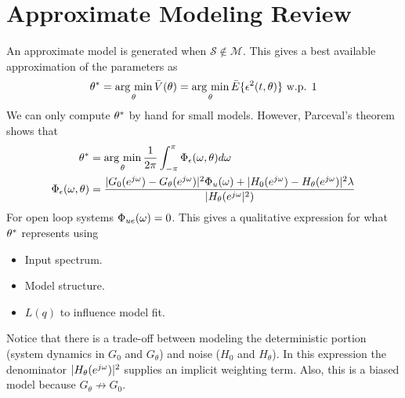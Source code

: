 \mainmatter%
\setcounter{page}{1}

\lectureseries[\course]{\course}

\date{November 24, 2009}

\setaddress%

\setcounter{lecture}{16}
\setcounter{chapter}{16}


\section{Approximate Modeling Review}
An approximate model is generated when $\mathcal{S}\notin\mathcal{M}$.
This gives a best available approximation of the parameters as
$$\theta^\ast = \mathop{\arg\,\min}\limits_\theta \bar{V}(\theta) = \mathop{\arg\,\min}\limits_\theta\bar{E}\{\epsilon^2(t,\theta)\} \text{ w.p. } 1$$
We can only compute $\theta^\ast$ by hand for small models.
However, Parceval's theorem shows that
\begin{align*}
\theta^\ast &= \mathop{\arg\,\min}\limits_\theta \frac{1}{2\pi}\int_{-\pi}^\pi \Phi_\epsilon(\omega,\theta)d\omega \\
\Phi_\epsilon(\omega,\theta) &= \frac{|G_0(e^{j\omega})-G_\theta(e^{j\omega})|^2\Phi_u(\omega) + |H_0(e^{j\omega})-H_\theta(e^{j\omega})|^2\lambda}{|H_\theta(e^{j\omega}|^2)}
\end{align*}
For open loop systems $\Phi_{ue}(\omega) = 0$.
This gives a qualitative expression for what $\theta^\ast$ represents using
\begin{itemize}
\item Input spectrum.
\item Model structure.
\item $L(q)$ to influence model fit.
\end{itemize}
Notice that there is a trade-off between modeling the deterministic portion (system dynamics in $G_0$ and $G_\theta$) and noise ($H_0$ and $H_\theta$).
In this expression the denominator $|H_\theta(e^{j\omega})|^2$ supplies an implicit weighting term.
Also, this is a biased model because $G_\theta\not\to G_0$.

